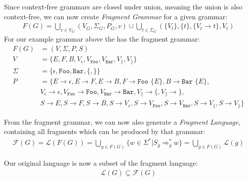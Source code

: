 \documentclass[runningheads,a4paper]{llncs}
\begin{document}
Since context-free grammars are closed under union, meaning the union is also context-free, we can now create \textit{Fragment Grammar} for a given grammar:
\begin{align*}
F(G) = 
\bigcup\limits_{v \in V_G} (V_G,\Sigma_G,P_G,v)
\cup
\bigcup\limits_{t \in \Sigma_G} (\{V_t\},\{t\},\{V_t \rightarrow t\}, V_t)
\end{align*}
For our example grammar above the has the fragment grammar:
\begin{align*}
F(G) &= (V,\Sigma,P,S)
\\V &= \{ E,F,B,V_{\epsilon},V_{\texttt{Foo}},V_{\texttt{Bar}},V_{\texttt{\{}},V_{\texttt{\}}} \}
\\\Sigma &= \{ \epsilon, \texttt{Foo}, \texttt{Bar}, \texttt{\{}, \texttt{\}} \}
\\P &= \{ 
E \rightarrow \epsilon
,E \rightarrow F
,E \rightarrow B
,F \rightarrow \texttt{Foo \{} E \texttt{\}}
,B \rightarrow \texttt{Bar \{} E \texttt{\}},
\\&
V_\epsilon \rightarrow \epsilon
,V_\texttt{Foo} \rightarrow \texttt{Foo}
,V_\texttt{Bar} \rightarrow \texttt{Bar}
,V_\texttt{\{} \rightarrow \texttt{\{}
,V_\texttt{\}} \rightarrow \texttt{\}},
\\&
S \rightarrow E
,S \rightarrow F
,S \rightarrow B
,S \rightarrow V_\epsilon
,S \rightarrow V_\texttt{Foo}
,S \rightarrow V_\texttt{Bar}
,S \rightarrow V_\texttt{\{}
,S \rightarrow V_\texttt{\}}
\}
\end{align*}

From the fragment grammar, we can now also generate a \textit{Fragment Language}, containing all fragments which can be produced by that grammar:
\begin{align*}
\mathcal{F}(G) 
= \mathcal{L}(F(G))
= \bigcup\limits_{g \in F(G)} \{ w \in \Sigma^* | S_g \Rightarrow_{g}^* w \}
= \bigcup\limits_{g \in F(G)} \mathcal{L}(g)
\end{align*}

Our original language is now a subset of the fragment language:
\begin{align*}
\mathcal{L}(G) \subseteq \mathcal{F}(G) 
\end{align*}

\newpage
\end{document}
